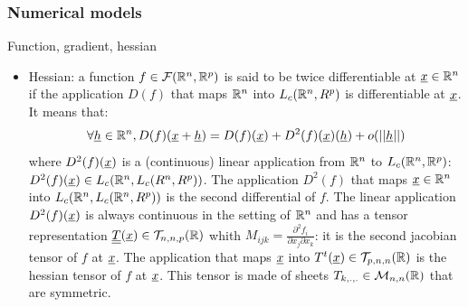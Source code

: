\documentclass[8pt]{beamer}
\begin{document}
\begin{frame}
  \frametitle{Numerical models}
  \begin{block}{Function, gradient, hessian}
    \begin{itemize}
    \item \alert{Hessian:} a function $f\in\mathcal{F}({\mathbb R}^n,{\mathbb R}^p)$ is said to be \alert{twice differentiable} at ${\underline{x}}\in{\mathbb R}^n$ if the application $D(f)$ that maps ${\mathbb R}^n$ into $L_c({\mathbb R}^n,R^p)$ is differentiable at ${\underline{x}}$. It means that:
      \begin{equation}
        \forall{\underline{h}}\in{\mathbb R}^n, D(f)({\underline{x}}+{\underline{h}})=D(f)({\underline{x}})+D^2(f)({\underline{x}})({\underline{h}})+o(||{\underline{h}}||)
      \end{equation}
      where $D^2(f)({\underline{x}})$ is a (continuous) linear application from ${\mathbb R}^n$ to $L_c({\mathbb R}^n,{\mathbb R}^p)$: $D^2(f)({\underline{x}})\in L_c({\mathbb R}^n,L_c(R^n,R^p))$. The application $D^2(f)$ that maps ${\underline{x}}\in{\mathbb R}^n$ into $L_c({\mathbb R}^n,L_c({\mathbb R}^n,R^p))$ is the \alert{second differential} of $f$. The linear application $D^2(f)({\underline{x}})$ is always continuous in the setting of ${\mathbb R}^n$ and has a tensor representation ${\underline{\underline{T}}}({\underline{x}})\in\mathcal{T}_{n,n,p}({\mathbb R})$ whith $M_{ijk}=\frac{\partial^2 f_i}{\partial x_j\partial x_k}$: it is the \alert{second jacobian tensor} of $f$ at ${\underline{x}}$. The application that maps ${\underline{x}}$ into $T^t({\underline{x}})\in\mathcal{T}_{p,n,n}({\mathbb R})$ is the \alert{hessian tensor} of $f$ at ${\underline{x}}$. This tensor is made of sheets $T_{k,.,.}\in\mathcal{M}_{n,n}({\mathbb R})$ that are \alert{symmetric}.
    \end{itemize}
  \end{block}
\end{frame}
\end{document}
